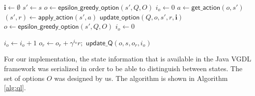 \begin{algorithm}[h]
	\caption{$\mathsf{SMDP~Q-learning}(Q, O, s, t, d, o)$}
	\label{alg:ql}
	\begin{algorithmic}[1]
		\State $\mathbf{i} \gets \emptyset$ 
		 \label{alg:ql:smainloop}
			\State $s' \gets s$ \label{alg:ql:copys} 
			 \label{alg:ql:sno} 
				\State $o \gets \mathsf{epsilon\_greedy\_option}(s', Q, O)$ 
				\State $i_o \gets 0$ 
			\EndIf \label{alg:ql:eno}
			 \label{alg:ql:sfor}
				\State $a \gets \mathsf{get\_action}(o, s')$ 
				\State $(s', r) \gets \mathsf{apply\_action}(s', a)$ \label{alg:ql:apply}
				\State $\mathsf{update\_option}(Q, o, s', r, \mathbf{i})$ 
					\State $o \gets \mathsf{epsilon\_greedy\_option}(s', Q, O)$ 
					\State $i_o \gets 0$
				\EndIf
			\EndFor \label{alg:ql:efor}
		\EndWhile \label{alg:ql:emainloop}
		\State {}
	\end{algorithmic}
\end{algorithm}
\begin{algorithm}[h]
	\caption{$\mathsf{update\_option}(Q, o, s, r, \mathbf{i})$}
	\label{alg:update}
	\begin{algorithmic}[1]
		\State $i_o \gets i_o + 1$ 
		\State $o_r \gets o_r + \gamma^{i_o} r;$
		 \label{alg:ql:sp} 
			\State $\mathsf{update\_Q}(o, s, o_r, i_o)$ 
		\EndIf
	\end{algorithmic}
\end{algorithm}

For our implementation, the state information that is available in the Java VGDL
framework was serialized in order to be able to distinguish between states. The
set of options $O$ was designed by us. The algorithm is shown in Algorithm
\ref{alg:ql}.

